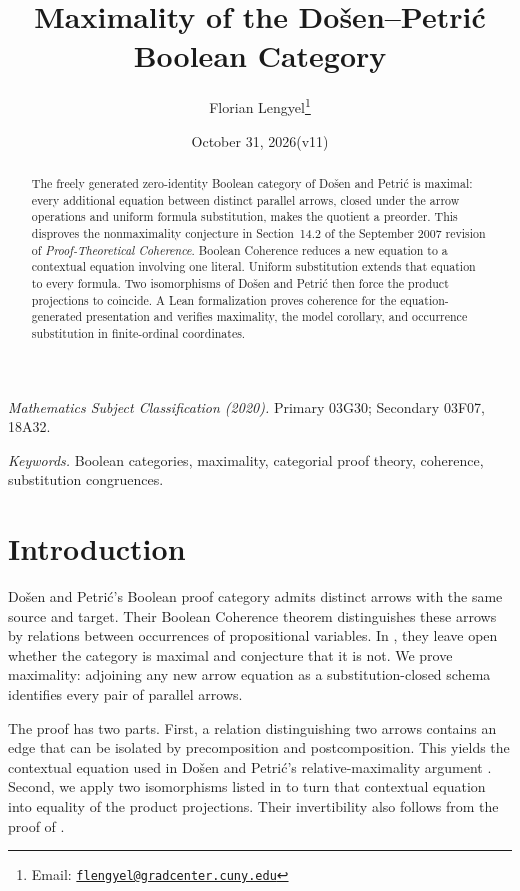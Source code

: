 \documentclass[11pt]{article}
\title{Maximality of the Do\v{s}en--Petri\'c Boolean Category}
\author{Florian Lengyel\thanks{Email: \href{mailto:flengyel@gradcenter.cuny.edu}{\texttt{flengyel@gradcenter.cuny.edu}}}}
\date{October 31, 2026\quad(v11)}
\begin{document}
\maketitle

\begin{abstract}
The freely generated zero-identity Boolean category of Do\v{s}en and
Petri\'c is maximal: every additional equation between distinct parallel
arrows, closed under the arrow operations and uniform formula
substitution, makes the quotient a preorder. This disproves the
nonmaximality conjecture in Section~14.2 of the September 2007 revision
of \emph{Proof-Theoretical Coherence}. Boolean Coherence reduces a new
equation to a contextual equation involving one literal. Uniform
substitution extends that equation to every formula. Two
isomorphisms of Do\v{s}en and Petri\'c then force the product projections
to coincide. A Lean formalization proves coherence for the equation-generated
presentation and verifies maximality, the model corollary, and
occurrence substitution in finite-ordinal coordinates.
\end{abstract}

\medskip
\noindent\textit{Mathematics Subject Classification (2020).}
Primary 03G30; Secondary 03F07, 18A32.

\smallskip
\noindent\textit{Keywords.} Boolean categories, maximality, categorial proof theory,
coherence, substitution congruences.

\section{Introduction}

Do\v{s}en and Petri\'c's Boolean proof category admits distinct arrows
with the same source and target. Their Boolean Coherence theorem
distinguishes these arrows by relations between occurrences of
propositional variables. In \cite[\S14.2, p.~322]{DP}, they leave open
whether the category is maximal and conjecture that it is not. We prove
maximality: adjoining any new arrow equation as a substitution-closed
schema identifies every pair of parallel arrows.

The proof has two parts. First, a relation distinguishing two arrows
contains an edge that can be isolated by precomposition and
postcomposition. This yields the contextual equation used in
Do\v{s}en and Petri\'c's relative-maximality argument
\cite[\S9.7, pp.~215--216]{DP}. Second, we apply two isomorphisms listed in
\cite[\S12.5, p.~294]{DP} to turn that contextual equation into equality
of the product projections. Their invertibility also follows from the
proof of \cite[Lemma~7]{DPIsomorphic}.
\end{document}
